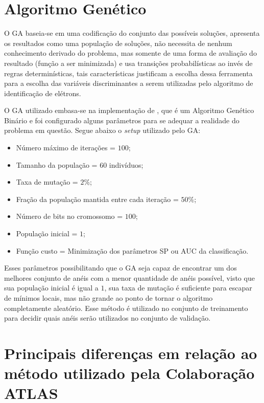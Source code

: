 \section{Algoritmo Genético}

O \ac{GA} baseia-se em uma codificação do conjunto das possíveis soluções, apresenta os resultados como uma população de soluções, não necessita de nenhum conhecimento derivado do problema, mas somente de uma forma de avaliação do resultado (função a ser minimizada) e usa transições probabilísticas ao invés de regras determinísticas, tais características justificam a escolha dessa ferramenta para a escolha das variáveis discriminantes a serem utilizadas pelo algoritmo de identificação de elétrons.

O \ac{GA} utilizado embasa-se na implementação de \cite{haupt1998practical}, que é um Algoritmo Genético Binário e foi configurado alguns parâmetros para se adequar a realidade do problema em questão. Segue abaixo o \textit{setup} utilizado pelo \ac{GA}:

\begin{itemize}
\item Número máximo de iterações = $100$;
\item Tamanho da população = $60$ indivíduos;
\item Taxa de mutação = $2\%$;
\item Fração da população mantida entre cada iteração = $50\%$;
\item Número de bits no cromossomo = $100$;
\item População inicial = $1$;
\item Função custo = Minimização dos parâmetros SP ou AUC da classificação.
\end{itemize}

Esses parâmetros possibilitando que o \ac{GA} seja capaz de encontrar um dos melhores conjunto de anéis com a menor quantidade de anéis possível, visto que sua população inicial é igual a $1$, sua taxa de mutação é suficiente para escapar de mínimos locais, mas não grande ao ponto de tornar o algoritmo completamente aleatório. Esse método é utilizado no conjunto de treinamento para decidir quais anéis serão utilizados no conjunto de validação.

\section{Principais diferenças em relação ao método utilizado pela Colaboração ATLAS}

